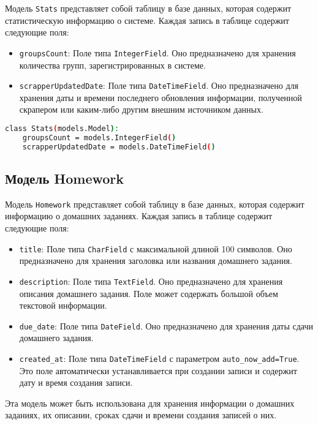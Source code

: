 Модель \texttt{Stats} представляет собой таблицу в базе данных,
которая содержит статистическую информацию о системе.
Каждая запись в таблице содержит следующие поля:

\begin{itemize}
    \item \texttt{groupsCount}: Поле типа \texttt{IntegerField}.
		Оно предназначено для хранения количества групп,
		зарегистрированных в системе.
    \item \texttt{scrapperUpdatedDate}: Поле типа \texttt{DateTimeField}.
		Оно предназначено для хранения даты
		и времени последнего обновления информации,
		полученной скрапером или каким-либо другим внешним источником данных.
\end{itemize}

\begin{lstlisting}[language=bash]
class Stats(models.Model):
    groupsCount = models.IntegerField()
    scrapperUpdatedDate = models.DateTimeField()
\end{lstlisting}

\subsection{Модель Homework}

Модель \texttt{Homework} представляет собой таблицу в базе данных,
которая содержит информацию о домашних заданиях.
Каждая запись в таблице содержит следующие поля:

\begin{itemize}
    \item \texttt{title}: Поле типа \texttt{CharField}
		с максимальной длиной 100 символов. Оно предназначено
		для хранения заголовка или названия домашнего задания.
    \item \texttt{description}: Поле типа \texttt{TextField}.
		Оно предназначено для хранения описания домашнего задания.
		Поле может содержать большой объем текстовой информации.
    \item \texttt{due\_date}: Поле типа \texttt{DateField}.
		Оно предназначено для хранения даты сдачи домашнего задания.
    \item \texttt{created\_at}: Поле типа \texttt{DateTimeField}
		с параметром \texttt{auto\_now\_add=True}.
		Это поле автоматически устанавливается при создании записи
		и содержит дату и время создания записи.
\end{itemize}

Эта модель может быть использована для хранения информации
о домашних заданиях, их описании,
сроках сдачи и времени создания записей о них.

